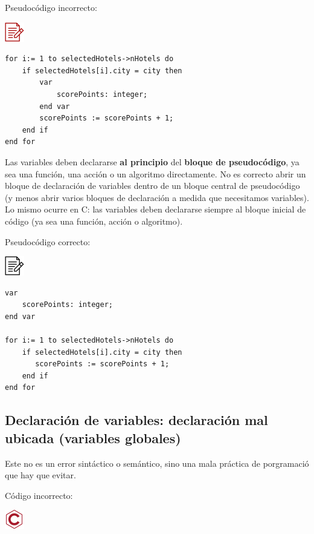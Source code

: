 \documentclass[
]{book}
\begin{document}
Pseudocódigo incorrecto:

\includegraphics{./img/alg_err.png}

\begin{verbatim}
for i:= 1 to selectedHotels->nHotels do 
    if selectedHotels[i].city = city then 
        var
            scorePoints: integer;
        end var
        scorePoints := scorePoints + 1;
    end if
end for
\end{verbatim}

Las variables deben declararse \textbf{al principio} del \textbf{bloque de pseudocódigo}, ya sea una función, una acción o un algoritmo directamente. No es correcto abrir un bloque de declaración de variables dentro de un bloque central de pseudocódigo (y menos abrir varios bloques de declaración a medida que necesitamos variables). Lo mismo ocurre en C: las variables deben declararse siempre al bloque inicial de código (ya sea una función, acción o algoritmo).

Pseudocódigo correcto:

\includegraphics{./img/alg.png}

\begin{verbatim}
var
    scorePoints: integer;
end var

for i:= 1 to selectedHotels->nHotels do 
    if selectedHotels[i].city = city then 
       scorePoints := scorePoints + 1;  
    end if
end for
\end{verbatim}

\hypertarget{declaraciuxf3n-de-variables-declaraciuxf3n-mal-ubicada-variables-globales}{%
\subsection{Declaración de variables: declaración mal ubicada (variables globales)}\label{declaraciuxf3n-de-variables-declaraciuxf3n-mal-ubicada-variables-globales}}

Este no es un error sintáctico o semántico, sino una mala práctica de porgramació que hay que evitar.

Código incorrecto:

\includegraphics{./img/c_err.png}
\end{document}
